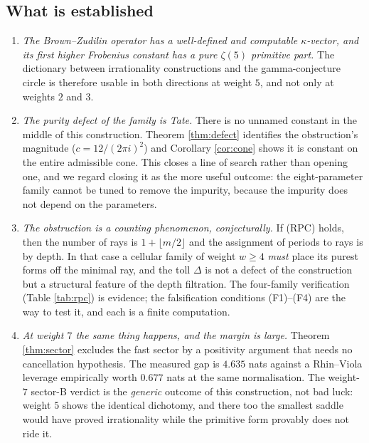 \documentclass[11pt,reqno]{amsart}
\theoremstyle{plain}
\theoremstyle{definition}
\theoremstyle{remark}
\begin{document}
\subsection{What is established}
\begin{enumerate}[label=(\arabic*),leftmargin=2.4em]
\item \emph{The Brown--Zudilin operator has a well-defined and computable $\kappa$-vector, and
its first higher Frobenius constant has a pure $\zeta(5)$ primitive part.} The dictionary between
irrationality constructions and the gamma-conjecture circle is therefore usable in both
directions at weight $5$, and not only at weights $2$ and $3$.

\item \emph{The purity defect of the family is Tate.} There is no unnamed constant in the middle
of this construction. Theorem \ref{thm:defect} identifies the obstruction's magnitude
($c=12/(2\pi i)^2$) and Corollary \ref{cor:cone} shows it is constant on the entire admissible
cone. This closes a line of search rather than opening one, and we regard closing it as the more
useful outcome: the eight-parameter family cannot be tuned to remove the impurity, because the
impurity does not depend on the parameters.

\item \emph{The obstruction is a counting phenomenon, conjecturally.} If (RPC) holds, then the
number of rays is $1+\lfloor m/2\rfloor$ and the assignment of periods to rays is by depth. In
that case a cellular family of weight $w\ge4$ \emph{must} place its purest forms off the minimal
ray, and the toll $\Delta$ is not a defect of the construction but a structural feature of the
depth filtration. The four-family verification (Table \ref{tab:rpc}) is evidence; the
falsification conditions (F1)--(F4) are the way to test it, and each is a finite computation.

\item \emph{At weight $7$ the same thing happens, and the margin is large.} Theorem
\ref{thm:sector} excludes the fast sector by a positivity argument that needs no cancellation
hypothesis. The measured gap is $4.635$ nats against a Rhin--Viola leverage empirically worth
$0.677$ nats at the same normalisation. The weight-$7$ sector-B verdict is the \emph{generic}
outcome of this construction, not bad luck: weight $5$ shows the identical dichotomy, and there
too the smallest saddle would have proved irrationality while the primitive form provably does not
ride it.
\end{enumerate}
\end{document}
